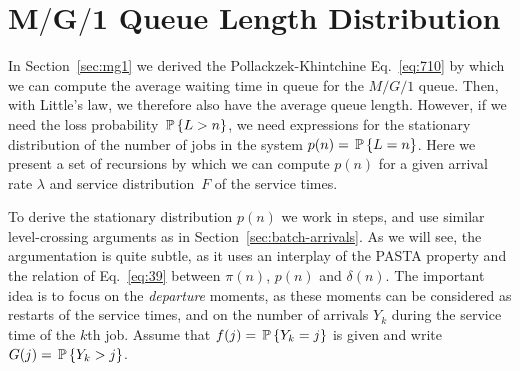 \section
[$M/G/1$ Queue Length Distribution]
{$\mathbf{M/G/1}$ Queue Length Distribution}
\label{sec:distr-queue-length}

In Section~\ref{sec:mg1} we derived the Pollackzek-Khintchine
Eq.~\eqref{eq:710} by which we can compute the average waiting time in
queue for the $M/G/1$ queue. Then, with Little's law, we therefore
also have the average queue length. However, if we need the loss
probability $\P{L>n}$, we need expressions for the stationary
distribution of the number of jobs in the system $p(n)=\P{L=n}$.  Here
we present a set of recursions by which we can compute $p(n)$ for
a given arrival rate $\lambda$ and service distribution~$F$ of the
service times.

To derive the stationary distribution $p(n)$ we work in steps, and use
similar level-crossing arguments as in
Section~\ref{sec:batch-arrivals}.  As we will see, the argumentation
is quite subtle, as it uses an interplay of the PASTA property and the
relation of Eq.~\eqref{eq:39} between $\pi(n)$, $p(n)$ and
$\delta(n)$. The important idea is to focus on the \emph{departure}
moments, as these moments can be considered as restarts of the service
times, and on the number of arrivals $Y_k$ during the service time of
the $k$th job.  Assume that $f(j) = \P{Y_k = j}$ is given and write
$G(j) = \P{Y_k > j}$.



